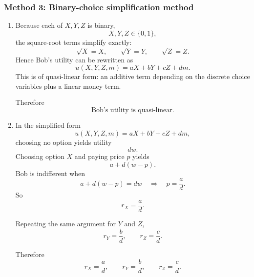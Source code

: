 \documentclass[12pt]{article}
\begin{document}
\subsubsection{Method 3: Binary-choice simplification method}
\begin{enumerate}[label=(\alph*)]
    \item
    Because each of \(X,Y,Z\) is binary,
    \[
    X,Y,Z\in\{0,1\},
    \]
    the square-root terms simplify exactly:
    \[
    \sqrt{X}=X,\qquad \sqrt{Y}=Y,\qquad \sqrt{Z}=Z.
    \]
    Hence Bob’s utility can be rewritten as
    \[
    u(X,Y,Z,m)=aX+bY+cZ+dm.
    \]
    This is of quasi-linear form: an additive term depending on the discrete choice variables plus a linear money term.

    Therefore
    \[
    \boxed{\text{Bob’s utility is quasi-linear.}}
    \]

    \item
    In the simplified form
    \[
    u(X,Y,Z,m)=aX+bY+cZ+dm,
    \]
    choosing no option yields utility
    \[
    dw.
    \]
    Choosing option \(X\) and paying price \(p\) yields
    \[
    a+d(w-p).
    \]
    Bob is indifferent when
    \[
    a+d(w-p)=dw
    \quad\Longrightarrow\quad
    p=\frac{a}{d}.
    \]
    So
    \[
    \boxed{r_X=\frac{a}{d}.}
    \]

    Repeating the same argument for \(Y\) and \(Z\),
    \[
    \boxed{r_Y=\frac{b}{d},\qquad r_Z=\frac{c}{d}.}
    \]

    Therefore
    \[
    \boxed{
    r_X=\frac{a}{d},\qquad
    r_Y=\frac{b}{d},\qquad
    r_Z=\frac{c}{d}.
    }
    \]
\end{enumerate}
\end{document}
